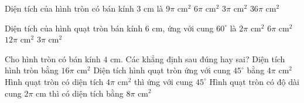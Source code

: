 

\begin{ex}%
	Diện tích của hình tròn có bán kính $3\text{ cm}$ là
	\choice
	{\True $9\pi\text{ cm}^2$}
	{$6\pi\text{ cm}^2$}
	{$3\pi\text{ cm}^2$}
	{$36\pi\text{ cm}^2$}
\end{ex}

\begin{ex}%
	Diện tích của hình quạt tròn bán kính $6\text{ cm}$, ứng với cung $60^\circ$ là
	\choice
	{$2\pi\text{ cm}^2$}
	{\True $6\pi\text{ cm}^2$}
	{$12\pi\text{ cm}^2$}
	{$3\pi\text{ cm}^2$}
	\loigiai{
		\[ S=\dfrac{\pi R^2n}{360}=\dfrac{\pi\cdot 6^2\cdot 60}{360}=6\pi\text{ (cm}^2). \]
	}
\end{ex}

\begin{ex}%
	Cho hình tròn có bán kính $4\text{ cm}$. Các khẳng định sau đúng hay sai?
	\choiceTF
	{\True Diện tích hình tròn bằng $16\pi\text{ cm}^2$}
	{Diện tích hình quạt tròn ứng với cung $45^\circ$ bằng $4\pi\text{ cm}^2$}
	{Hình quạt tròn có diện tích $4\pi\text{ cm}^2$ thì ứng với cung $45^\circ$}
	{Hình quạt tròn có độ dài cung $2\pi\text{ cm}$ thì có diện tích bằng $8\pi\text{ cm}^2$}
\end{ex}


